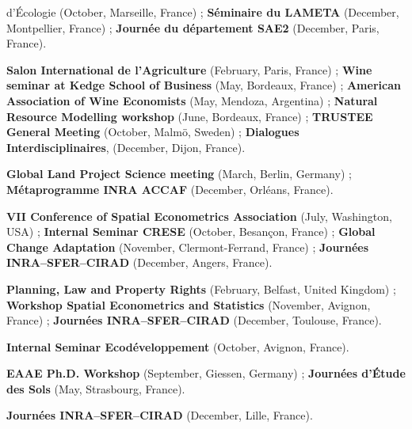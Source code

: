 \documentclass[12pt, a4paper]{./style}
\begin{document}
\begin{description}
{d'Écologie} (October, Marseille, France) ; \textbf{Séminaire du LAMETA}
(December, Montpellier, France) ; \textbf{Journée du département SAE2}
(December, Paris, France).
\item[{2015}] \textbf{Salon International de l'Agriculture}
(February, Paris, France) ; \textbf{Wine seminar at Kedge
School of Business} (May, Bordeaux, France) ; \textbf{American
Association of Wine Economists} (May, Mendoza,
Argentina) ; \textbf{Natural Resource Modelling workshop}
(June, Bordeaux, France) ; \textbf{TRUSTEE General Meeting}
(October, Malmö, Sweden) ; \textbf{Dialogues
Interdisciplinaires}, (December, Dijon, France).
\item[{2014}] \textbf{Global Land Project Science meeting} (March,
Berlin, Germany) ; \textbf{Métaprogramme INRA ACCAF} (December,
Orléans, France).
\item[{2013}] \textbf{VII Conference of Spatial Econometrics
Association} (July, Washington, USA) ; \textbf{Internal Seminar
CRESE} (October, Besançon, France) ; \textbf{Global Change
Adaptation} (November, Clermont-Ferrand, France) ;
\textbf{Journées INRA--SFER--CIRAD} (December, Angers, France).
\item[{2012}] \textbf{Planning, Law and Property Rights} (February, Belfast,
United Kingdom) ; \textbf{Workshop Spatial Econometrics and Statistics}
(November, Avignon, France) ; \textbf{Journées INRA--SFER--CIRAD}
(December, Toulouse, France).
\item[{2010}] \textbf{Internal Seminar Ecodéveloppement} (October, Avignon,
France).
\item[{2009}] \textbf{EAAE Ph.D. Workshop} (September, Giessen, Germany) ;
\textbf{Journées d'Étude des Sols} (May, Strasbourg, France).
\item[{2008}] \textbf{Journées INRA--SFER--CIRAD} (December, Lille, France).
\end{description}
\label{sec:org9a6f688}
\label{sec:orgf96bc6f}
\end{document}
